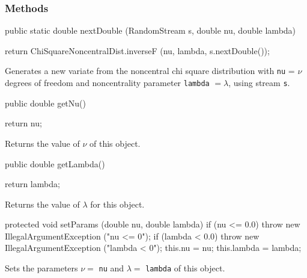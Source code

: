 \subsubsection* {Methods}
\begin{code}

   public static double nextDouble (RandomStream s,
                                    double nu, double lambda) \begin{hide} {
      return ChiSquareNoncentralDist.inverseF (nu, lambda, s.nextDouble());
   }
\end{hide}
\end{code}
\begin{tabb} Generates a new variate from the noncentral chi square
distribution with \texttt{nu} = $\nu$ degrees of freedom and noncentrality 
parameter \texttt{lambda} $=\lambda$,
 using stream \texttt{s}.
\end{tabb}
\begin{code}

   public double getNu()\begin{hide} {
      return nu;
   }\end{hide}
\end{code}
 \begin{tabb} Returns the value of  $\nu$ of this object.
 \end{tabb}
\begin{code}

   public double getLambda()\begin{hide} {
      return lambda;
   }\end{hide}
\end{code}
\begin{tabb}
  Returns the value of $\lambda$ for this object.
\end{tabb}
\begin{hide}\begin{code}

   protected void setParams (double nu, double lambda) {
      if (nu <= 0.0)
         throw new IllegalArgumentException ("nu <= 0");
      if (lambda < 0.0)
         throw new IllegalArgumentException ("lambda < 0");
      this.nu = nu;
      this.lambda = lambda;
   }
\end{code}
\begin{tabb} Sets the parameters $\nu =$ \texttt{nu} and $\lambda = $
  \texttt{lambda} of this object.
\end{tabb}
\begin{code}
}
\end{code}
\end{hide}

